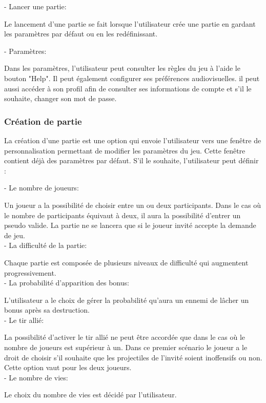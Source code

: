 \documentclass[a4paper,12pt]{article}
\begin{document}
- Lancer une partie:

Le lancement d’une partie se fait lorsque l’utilisateur crée une partie en gardant les paramètres par défaut ou en les redéfinissant.

- Paramètres:

Dans les paramètres, l'utilisateur peut consulter les règles du jeu à l'aide le bouton "Help". Il peut également configurer ses préférences audiovisuelles. il peut aussi accéder à son profil afin de consulter ses informations de compte et s'il le souhaite, changer son mot de passe.

\subsubsection{Création de partie}
La création d'une partie est une option qui envoie l'utilisateur vers une fenêtre de personnalisation permettant de modifier les paramètres du jeu.
Cette fenêtre contient déjà des paramètres par défaut.
S'il le souhaite, l'utilisateur peut définir :

- Le nombre de joueurs: 

Un joueur a la possibilité de choisir entre un ou deux participants. Dans le cas où le nombre de participants équivaut à deux, il aura la possibilité d'entrer un pseudo valide. La partie ne se lancera que si le joueur invité accepte la demande de jeu. \\

- La difficulté de la partie: 

Chaque partie est composée de plusieurs niveaux de difficulté qui augmentent progressivement.  \\

- La probabilité d'apparition des bonus:

L'utilisateur a le choix de gérer la probabilité qu'aura un ennemi de lâcher un bonus après sa destruction. \\

- Le tir allié: 

La possibilité d'activer le tir allié ne peut être accordée que dans le cas où le nombre de joueurs est supérieur à un.
Dans ce premier scénario le joueur a le droit de choisir s'il souhaite que les projectiles de l'invité soient inoffensifs ou non. Cette option vaut pour les deux joueurs. \\

- Le nombre de vies: 

Le choix du nombre de vies est décidé par l'utilisateur. \\
\end{document}
